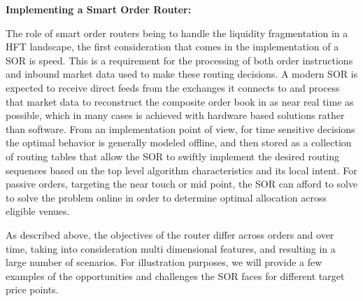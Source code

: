 \noindent\textbf{Implementing a Smart Order Router:} \twomedskip


The role of smart order routers being to handle the liquidity fragmentation in a HFT landscape, the first consideration that comes in the implementation of a SOR is speed. This is a requirement for the processing of both order instructions and inbound market data used to make these routing decisions. A modern SOR is expected to receive direct feeds from the exchanges it connects to and process that market data to reconstruct the composite order book in as near real time as possible, which in many cases is achieved with hardware based solutions rather than software. From an implementation point of view, for time sensitive decisions the optimal behavior is generally modeled offline, and then stored as a collection of routing tables that allow the SOR to swiftly implement the desired routing sequences based on the top level algorithm characteristics and its local intent. For passive orders, targeting the near touch or mid point, the SOR can afford to solve to solve the problem online in order to determine optimal allocation across eligible venues. 


As described above, the objectives of the router differ across orders and over time, taking into consideration multi dimensional features, and resulting in a large number of scenarios. For illustration purposes, we will provide a few examples of the opportunities and challenges the SOR faces for different target price points. 



